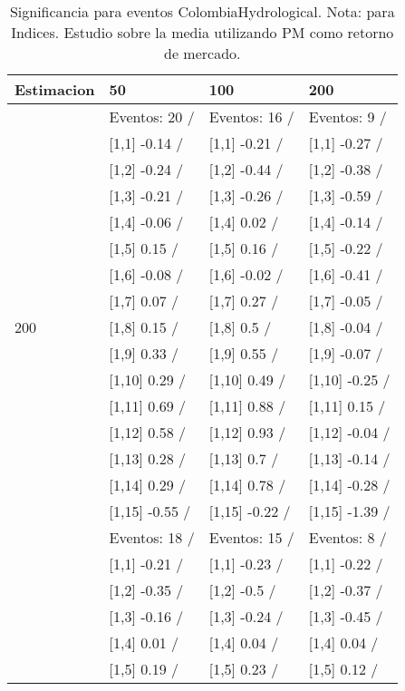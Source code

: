 \begin{table}

\caption{Significancia para eventos ColombiaHydrological. Nota: para Indices. Estudio sobre la media utilizando PM como retorno de mercado.}
\centering
\begin{tabular}[t]{llll}
\toprule
Estimacion & 50 & 100 & 200\\
\midrule
 & Eventos:  20 / & Eventos:  16 / & Eventos:  9 /\\
 & {}[1,1] -0.14  / & {}[1,1] -0.21  / & {}[1,1] -0.27  /\\
 & {}[1,2] -0.24  / & {}[1,2] -0.44  / & {}[1,2] -0.38  /\\
 & {}[1,3] -0.21  / & {}[1,3] -0.26  / & {}[1,3] -0.59  /\\
 & {}[1,4] -0.06  / & {}[1,4] 0.02  / & {}[1,4] -0.14  /\\
\addlinespace
 & {}[1,5] 0.15  / & {}[1,5] 0.16  / & {}[1,5] -0.22  /\\
 & {}[1,6] -0.08  / & {}[1,6] -0.02  / & {}[1,6] -0.41  /\\
 & {}[1,7] 0.07  / & {}[1,7] 0.27  / & {}[1,7] -0.05  /\\
200 & {}[1,8] 0.15  / & {}[1,8] 0.5  / & {}[1,8] -0.04  /\\
 & {}[1,9] 0.33  / & {}[1,9] 0.55  / & {}[1,9] -0.07  /\\
\addlinespace
 & {}[1,10] 0.29  / & {}[1,10] 0.49  / & {}[1,10] -0.25  /\\
 & {}[1,11] 0.69  / & {}[1,11] 0.88  / & {}[1,11] 0.15  /\\
 & {}[1,12] 0.58  / & {}[1,12] 0.93  / & {}[1,12] -0.04  /\\
 & {}[1,13] 0.28  / & {}[1,13] 0.7  / & {}[1,13] -0.14  /\\
 & {}[1,14] 0.29  / & {}[1,14] 0.78  / & {}[1,14] -0.28  /\\
\addlinespace
 & {}[1,15] -0.55  / & {}[1,15] -0.22  / & {}[1,15] -1.39  /\\
 & Eventos:  18 / & Eventos:  15 / & Eventos:  8 /\\
 & {}[1,1] -0.21  / & {}[1,1] -0.23  / & {}[1,1] -0.22  /\\
 & {}[1,2] -0.35  / & {}[1,2] -0.5  / & {}[1,2] -0.37  /\\
 & {}[1,3] -0.16  / & {}[1,3] -0.24  / & {}[1,3] -0.45  /\\
\addlinespace
 & {}[1,4] 0.01  / & {}[1,4] 0.04  / & {}[1,4] 0.04  /\\
 & {}[1,5] 0.19  / & {}[1,5] 0.23  / & {}[1,5] 0.12  /\\

\end{tabular}
\end{table}
